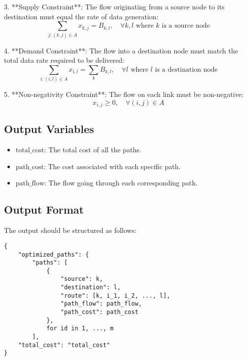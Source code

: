 \documentclass{article}
\begin{document}
3. **Supply Constraint**: The flow originating from a source node to its destination must equal the rate of data generation:
   \[
   \sum_{j: (k,j) \in A} x_{k,j} = B_{k,l}, \quad \forall k, l \text{ where } k \text{ is a source node}
   \]

4. **Demand Constraint**: The flow into a destination node must match the total data rate required to be delivered:
   \[
   \sum_{i: (i,l) \in A} x_{i,l} = \sum_{k} B_{k,l}, \quad \forall l \text{ where } l \text{ is a destination node}
   \]

5. **Non-negativity Constraint**: The flow on each link must be non-negative:
   \[
   x_{i,j} \geq 0, \quad \forall (i,j) \in A
   \]

\subsection*{Output Variables}
\begin{itemize}
    \item \( \text{total\_cost} \): The total cost of all the paths.
    \item \( \text{path\_cost} \): The cost associated with each specific path.
    \item \( \text{path\_flow} \): The flow going through each corresponding path.
\end{itemize}

\subsection*{Output Format}
The output should be structured as follows:
\begin{verbatim}
{
    "optimized_paths": {
        "paths": [
            {
                "source": k,
                "destination": l,
                "route": [k, i_1, i_2, ..., l],
                "path_flow": path_flow,
                "path_cost": path_cost
            },
            for id in 1, ..., m 
        ],
    "total_cost": "total_cost"
}
\end{verbatim}
\end{document}
